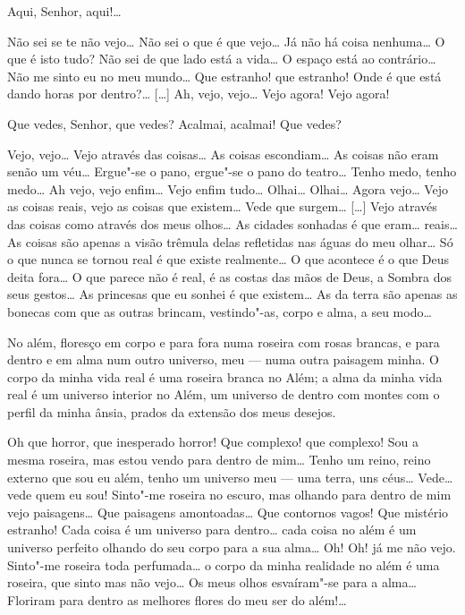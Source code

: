  Aqui, Senhor, aqui!\ldots{}

 Não sei se te não vejo\ldots{} Não sei o que é que vejo\ldots{} Já
não há coisa nenhuma\ldots{}  O que é
isto tudo? Não sei de que lado está a vida\ldots{} O espaço está ao
contrário\ldots{} Não me sinto eu no meu mundo\ldots{} Que estranho! que
estranho! Onde é que está dando horas por dentro?\ldots{} [\ldots{}] Ah, vejo,
vejo\ldots{} Vejo agora! Vejo agora! 

 Que vedes, Senhor, que vedes? Acalmai, acalmai! Que vedes?

 Vejo, vejo\ldots{} Vejo através das coisas\ldots{} As coisas
escondiam\ldots{} As coisas não eram senão um véu\ldots{} Ergue"-se o pano,
ergue"-se o pano do teatro\ldots{} Tenho medo, tenho medo\ldots{} Ah vejo, vejo
enfim\ldots{} Vejo enfim tudo\ldots{} Olhai\ldots{} Olhai\ldots{} Agora vejo\ldots{} Vejo as
coisas reais, vejo as coisas que existem\ldots{} Vede que surgem\ldots{} [\ldots{}]
Vejo através das coisas como através dos meus olhos\ldots{} As cidades
sonhadas é que eram\ldots{} reais\ldots{} As coisas são apenas a visão trêmula
delas refletidas nas águas do meu olhar\ldots{} Só o que nunca se tornou
real é que existe realmente\ldots{} O que acontece é o que Deus deita
fora\ldots{} O que parece não é real, é as costas das mãos de Deus, a
Sombra dos seus gestos\ldots{} As princesas que eu sonhei é que existem\ldots{}
As da terra são apenas as bonecas com que as outras brincam,
vestindo"-as, corpo e alma, a seu modo\ldots{}

 No além, floresço em corpo e para fora numa roseira com
rosas brancas, e para dentro e em alma num outro universo, meu --- numa
outra paisagem minha. O corpo da minha vida real é uma roseira branca
no Além; a alma da minha vida real é um universo interior no Além, um
universo de dentro com montes com o perfil da minha ânsia, prados da
extensão dos meus desejos.

 Oh que horror, que inesperado horror! Que complexo! que
complexo! Sou a mesma roseira, mas estou vendo para dentro de mim\ldots{}
Tenho um reino, reino externo que sou eu além, tenho um universo meu
--- uma terra, uns céus\ldots{} Vede\ldots{} vede quem eu sou! Sinto"-me roseira
no escuro, mas olhando para dentro de mim vejo paisagens\ldots{} Que
paisagens amontoadas\ldots{} Que contornos vagos! Que mistério estranho!
Cada coisa é um universo para dentro\ldots{} cada coisa no além é um
universo perfeito olhando do seu corpo para a sua alma\ldots{} Oh! Oh! já
me não vejo. Sinto"-me roseira toda perfumada\ldots{} o corpo da minha
realidade no além é uma roseira, que sinto mas não vejo\ldots{} Os meus
olhos esvaíram"-se para a alma\ldots{} Floriram para dentro as melhores
flores do meu ser do além!\ldots{}

